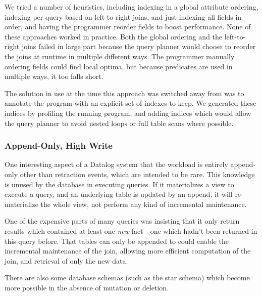 We tried a number of heuristics, including indexing in a global attribute ordering, indexing per query based on left-to-right joins, and just indexing all fields in order, and having the programmer reorder fields to boost performance.
None of these approaches worked in practice.
Both the global ordering and the left-to-right joins failed in large part because the query planner would choose to reorder the joins at runtime in multiple different ways.
The programmer manually ordering fields could find local optima, but because predicates are used in multiple ways, it too falls short.

The solution in use at the time this approach was switched away from was to annotate the program with an explicit set of indexes to keep.
We generated these indices by profiling the running program, and adding indices which would allow the query planner to avoid nested loops or full table scans where possible.

\subsubsection{Append-Only, High Write}
One interesting aspect of a Datalog system that the workload is entirely append-only other than retraction events, which are intended to be rare.
This knowledge is unused by the database in executing queries.
If it materializes a view to execute a query, and an underlying table is updated by an append, it will re-materialize the whole view, not perform any kind of incremental maintenance.

One of the expensive parts of many queries was insisting that it only return results which contained at least one \emph{new} fact - one which hadn't been returned in this query before.
That tables can only be appended to could enable the incremental maintenance of the join, allowing more efficient computation of the join, and retrieval of only the new data.

There are also some database schemas (such as the star schema) which become more possible in the absence of mutation or deletion.
